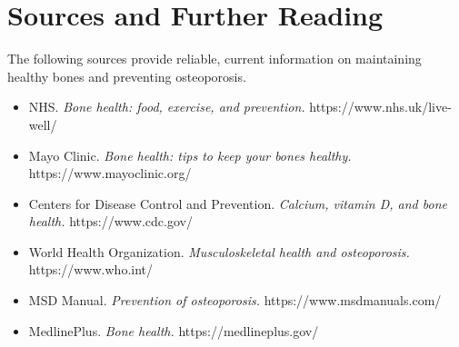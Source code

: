 \section*{Sources and Further Reading}
The following sources provide reliable, current information on maintaining healthy bones and preventing osteoporosis.
\begin{itemize}
    \item NHS. \textit{Bone health: food, exercise, and prevention.} https://www.nhs.uk/live-well/
    \item Mayo Clinic. \textit{Bone health: tips to keep your bones healthy.} https://www.mayoclinic.org/
    \item Centers for Disease Control and Prevention. \textit{Calcium, vitamin D, and bone health.} https://www.cdc.gov/
    \item World Health Organization. \textit{Musculoskeletal health and osteoporosis.} https://www.who.int/
    \item MSD Manual. \textit{Prevention of osteoporosis.} https://www.msdmanuals.com/
    \item MedlinePlus. \textit{Bone health.} https://medlineplus.gov/
\end{itemize}
